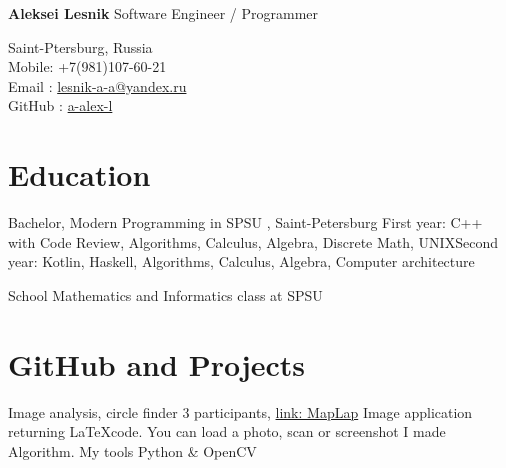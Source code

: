 \documentclass[12pt,a4paper]{moderncv}
\begin{document}

	\begin{minipage} {0.7\textwidth}
		\begin{flushleft}
			\huge \textbf{Aleksei Lesnik} 
			\newline
			\textcolor[gray]{0.4} {
			    \indent Software Engineer / Programmer\\
			}
			\normalsize
		\end{flushleft}
	\end{minipage}
	\begin{minipage} {0.3\textwidth}
		\begin{flushright}
			\textcolor[gray]{0.4} {
				\indent Saint-Ptersburg, Russia\\
				\indent Mobile: +7(981)107-60-21  \\
				\indent Email : \textcolor{blue} {\href{mailto:lesnik-a-a@yandex.ru} {lesnik-a-a@yandex.ru}}\\ 
				\indent GitHub : \textcolor{blue} {\href{https://github.com/a-alex-l} {a-alex-l}}\\  	
			}
		\end{flushright}
	\end{minipage}

    \section{Education}
    
         {Bachelor, Modern Programming in SPSU} {}{} {\textcolor{blue} {}, Saint-Petersburg} {First year: C++ with Code Review, Algorithms, Calculus, Algebra, Discrete Math, UNIX\newline  Second year: Kotlin, Haskell, Algorithms, Calculus, Algebra, Computer architecture}
    
         {School} {}{} {Mathematics and Informatics class at SPSU} {}
        
    \section{GitHub and Projects}
        
         {Image analysis, circle finder} {3 participants, \textcolor{blue} {\href{https://github.com/a-alex-l/MapLap} {link: MapLap}}} {} {\newline Image application returning \LaTeX code. You can load a photo, scan or screenshot} {I made Algorithm. My tools \textcolor{Attention} {Python \& OpenCV} }
        
\end{document}

